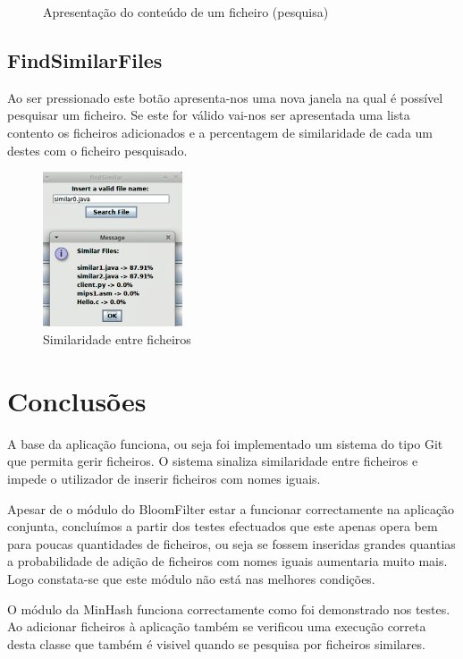 \documentclass{report}
\begin{document}
\begin{figure}[!tbp]
\begin{minipage}[b]{0.49\textwidth}
    \caption{Apresentação do conteúdo de um ficheiro (pesquisa)}
  \end{minipage}
\end{figure}

\section{FindSimilarFiles}
Ao ser pressionado este botão apresenta-nos uma nova janela na qual é possível pesquisar um ficheiro. Se este for válido vai-nos ser apresentada uma lista contento os ficheiros adicionados e a percentagem de similaridade de cada um destes com o ficheiro pesquisado.

\begin{figure}[h]
\center %
\includegraphics[height=130pt]{simila.png}
\caption{Similaridade entre ficheiros}
\label{fig:Fig46}
\end{figure}


\chapter{Conclusões}
\label{chap.conclusao}

A base da aplicação funciona, ou seja foi implementado um sistema do tipo Git que permita gerir ficheiros. O sistema sinaliza similaridade entre ficheiros e impede o utilizador de inserir ficheiros com nomes iguais.

Apesar de o módulo do BloomFilter estar a funcionar correctamente na aplicação conjunta, concluímos a partir dos testes efectuados que este apenas opera bem para poucas quantidades de ficheiros, ou seja se fossem inseridas grandes quantias a probabilidade de adição de ficheiros com nomes iguais aumentaria muito mais. Logo constata-se que este módulo não está nas melhores condições.

O módulo da MinHash funciona correctamente como foi demonstrado nos testes. Ao adicionar ficheiros à aplicação também se verificou uma execução correta desta classe que também é visivel quando se pesquisa por ficheiros similares.
\end{document}
